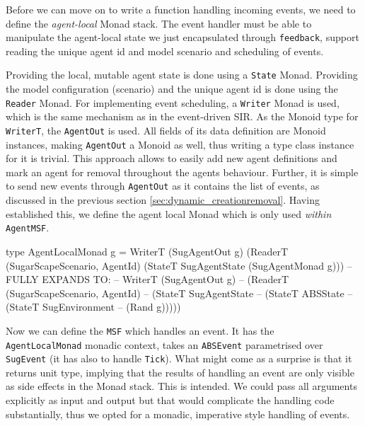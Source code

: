 Before we can move on to write a function handling incoming events, we need to define the \textit{agent-local} Monad stack. The event handler must be able to manipulate the agent-local state we just encapsulated through \texttt{feedback}, support reading the unique agent id and model scenario and scheduling of events.

Providing the local, mutable agent state is done using a \texttt{State} Monad. Providing the model configuration (scenario) and the unique agent id is done using the \texttt{Reader} Monad. For implementing event scheduling, a \texttt{Writer} Monad is used, which is the same mechanism as in the event-driven SIR. As the Monoid type for \texttt{WriterT}, the \texttt{AgentOut} is used. All fields of its data definition are Monoid instances, making \texttt{AgentOut} a Monoid as well, thus writing a type class instance for it is trivial. This approach allows to easily add new agent definitions and mark an agent for removal throughout the agents behaviour. Further, it is simple to send new events through \texttt{AgentOut} as it contains the list of events, as discussed in the previous section \ref{sec:dynamic_creationremoval}. Having established this, we define the agent local Monad which is only used \textit{within} \texttt{AgentMSF}.

\begin{HaskellCode}
type AgentLocalMonad g = WriterT (SugAgentOut g) 
                           (ReaderT (SugarScapeScenario, AgentId) 
                             (StateT SugAgentState (SugAgentMonad g)))     
-- FULLY EXPANDS TO:
-- WriterT (SugAgentOut g) 
--  (ReaderT (SugarScapeScenario, AgentId) 
--    (StateT SugAgentState 
--      (StateT ABSState 
--        (StateT SugEnvironment 
--          (Rand g)))))
\end{HaskellCode}

Now we can define the \texttt{MSF} which handles an event. It has the \\ \texttt{AgentLocalMonad} monadic context, takes an \texttt{ABSEvent} parametrised over \\ \texttt{SugEvent} (it has also to handle \texttt{Tick}). What might come as a surprise is that it returns unit type, implying that the results of handling an event are only visible as side effects in the Monad stack. This is intended. We could pass all arguments explicitly as input and output but that would complicate the handling code substantially, thus we opted for a monadic, imperative style handling of events.

